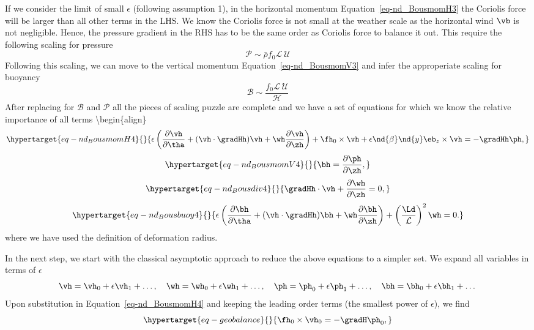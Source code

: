 \documentclass[
  letterpaper,
  twocolumn,
  landscape]{report}
\begin{document}
If we consider the limit of small \(\epsilon\) (following assumption 1),
in the horizontal momentum Equation~\ref{eq-nd_BousmomH3} the Coriolis
force will be larger than all other terms in the LHS. We know the
Coriolis force is not small at the weather scale as the horizontal wind
\(\vb\) is not negligible. Hence, the pressure gradient in the RHS has
to be the same order as Coriolis force to balance it out. This require
the following scaling for pressure \[
    \mathcal{P} \sim \bar\rho f_0 \mathcal{L}\ \mathcal{U}
\] Following this scaling, we can move to the vertical momentum
Equation~\ref{eq-nd_BousmomV3} and infer the approperiate scaling for
buoyancy \[
    \mathcal{B} \sim \frac{f_0 \mathcal{L}\ \mathcal{U}}{\mathcal{H}}
\] After replacing for \(\mathcal{B}\) and \(\mathcal{P}\) all the
pieces of scaling puzzle are complete and we have a set of equations for
which we know the relative importance of all terms
\textbackslash begin\{align\}
\begin{equation}\protect\hypertarget{eq-nd_BousmomH4}{}{ \epsilon \left(  \frac{\partial\vh}{\partial \tha} + (\vh \cdot \gradHh ) \vh + \wh \frac{\partial \vh }{\partial \zh} \right) +  \fh_0 \times \vh + \epsilon \nd{\beta} \nd{y} \eb_z \times \vh = - \gradHh \ph, }\label{eq-nd_BousmomH4}\end{equation}
\begin{equation}\protect\hypertarget{eq-nd_BousmomV4}{}{ \bh = \frac{\partial \ph }{\partial \zh}, }\label{eq-nd_BousmomV4}\end{equation}
\begin{equation}\protect\hypertarget{eq-nd_Bousdiv4}{}{ \gradHh \cdot\vh + \frac{\partial \wh}{\partial \zh} =0, }\label{eq-nd_Bousdiv4}\end{equation}
\begin{equation}\protect\hypertarget{eq-nd_Bousbuoy4}{}{ \epsilon \left(\frac{\partial \bh}{\partial \tha} +(\vh\cdot\gradHh ) \bh + \wh \frac{\partial \bh}{\partial \zh}  \right) + \left( \frac{\Ld}{\mathcal{L}} \right)^2 \wh =0. }\label{eq-nd_Bousbuoy4}\end{equation}
where we have used the definition of deformation radius.

In the next step, we start with the classical asymptotic approach to
reduce the above equations to a simpler set. We expand all variables in
terms of \(\epsilon\) \[
    \vh = \vh_0 + \epsilon \vh_1 + \dots, \quad \wh = \wh_0 + \epsilon \wh_1 + \dots, \quad
    \ph = \ph_0 + \epsilon \ph_1 + \dots, \quad \bh = \bh_0 + \epsilon \bh_1 + \dots  
\] Upon substitution in Equation~\ref{eq-nd_BousmomH4} and keeping the
leading order terms (the smallest power of \(\epsilon\)), we find
\begin{equation}\protect\hypertarget{eq-geobalance}{}{  \fh_0 \times \vh_0 = - \gradH \ph_0, }\label{eq-geobalance}\end{equation}
\end{document}
